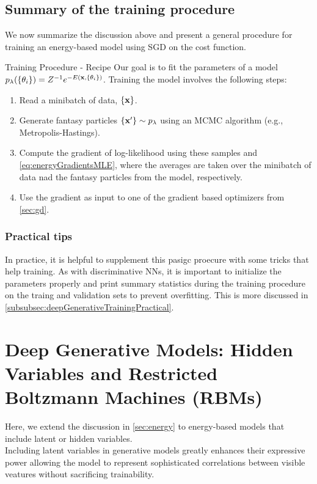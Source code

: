 \subsection{Summary of the training procedure}
\label{subsec:energyTrainingProcedure}
We now summarize the discussion above and present a general procedure for training an energy-based model using SGD on the cost function.
\begin{mybox}{Training Procedure - Recipe}
	Our goal is to fit the parameters of a model $p_{\lambda}(\{\theta_i\}) = Z^{-1} e^{-E(\mathbf{x},\{\theta_i\})}$. Training the model involves the following steps:
		\begin{enumerate}
			\item Read a minibatch of data, $\{\mathbf{x}\}$.
			\item Generate fantasy particles $\{\mathbf{x}^\prime\} \sim p_\lambda$ using an MCMC algorithm (e.g., Metropolis-Hastings).
			\item Compute the gradient of log-likelihood using these samples and \ref{eq:energyGradientsMLE}, where the averages are taken over the minibatch of data nad the fantasy particles from the model, respectively.
			\item Use the gradient as input to one of the gradient based optimizers from \ref{sec:gd}.
		\end{enumerate}
\end{mybox}
\subsubsection{Practical tips}
In practice, it is helpful to supplement this pasigc proecure with some tricks that help training. As with discriminative NNs, it is important to initialize the parameters properly and print summary statistics during the training procedure on the traing and validation sets to prevent overfitting. This is more discussed in \ref{subsubsec:deepGenerativeTrainingPractical}.











\section{Deep Generative Models: Hidden Variables and Restricted Boltzmann Machines (RBMs)}
\label{sec:deepGenerative}
Here, we extend the discussion in \ref{sec:energy} to energy-based models that include latent or hidden variables.\\
Including latent variables in generative models greatly enhances their expressive power allowing the model to represent sophisticated correlations between visible veatures without sacrificing trainability.

